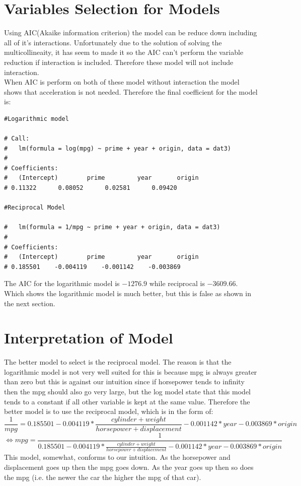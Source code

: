 \documentclass[11pt]{article} %
\begin{document}
\section{Variables Selection for Models}
Using AIC(Akaike information criterion) the model can be reduce down including all of it's interactions. Unfortunately due to the solution of solving the multicollineaity, it has seem to made it so the AIC can't perform the variable reduction if interaction is included. Therefore these model will not include interaction.\\
When AIC is perform on both of these model without interaction the model shows that acceleration is not needed. Therefore the final coefficient for the model is:
\begin{lstlisting}
#Logarithmic model

# Call:
#   lm(formula = log(mpg) ~ prime + year + origin, data = dat3)
# 
# Coefficients:
#   (Intercept)        prime         year       origin  
# 0.11322      0.08052      0.02581      0.09420  

#Reciprocal Model

#   lm(formula = 1/mpg ~ prime + year + origin, data = dat3)
# 
# Coefficients:
#   (Intercept)        prime         year       origin  
# 0.185501    -0.004119    -0.001142    -0.003869  
\end{lstlisting}
The AIC for the logarithmic model is $-1276.9$ while reciprocal is $-3609.66$. Which shows the logarithmic model is much better, but this is false as shown in the next section.


\section{Interpretation of Model}
The better model to select is the reciprocal model. The reason is that the logarithmic model is not very well suited for this is because mpg is always greater than zero but this is against our intuition since if horsepower tends to infinity then the mpg should also go very large, but the log model state that this model tends to a constant if all other variable is kept at the same value. Therefore the better model is to use the reciprocal model, which is in the form of:
$$
\frac{1}{mpg}=0.185501-0.004119*\frac{cylinder+weight}{horsepower + displacement}-0.001142*year-0.003869*origin  
$$
$$
\Leftrightarrow mpg = \frac{1}{0.185501-0.004119*\frac{cylinder+weight}{horsepower + displacement}-0.001142*year-0.003869*origin}
$$
This model, somewhat, conforms to our intuition. As the horsepower and displacement goes up then the mpg goes down. As the year goes up then so does the mpg (i.e. the newer the car the higher the mpg of that car).
\end{document}

